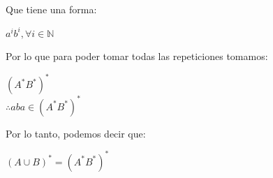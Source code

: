 \begin{enumerate}
        Que tiene una forma:
        \begin{center}
            $a^i b^i, \forall i \in \mathbb{N}$
        \end{center}
        
        Por lo que para poder tomar todas las repeticiones tomamos:
        \begin{center}
            $(A^*B^*)^*$\\
            $\therefore aba \in (A^*B^*)^*$
        \end{center}
        
        Por lo tanto, podemos decir que:
        \begin{center}
            $\boxed{(A \cup B)^* = (A^*B^*)^*}$
        \end{center}
\end{enumerate}